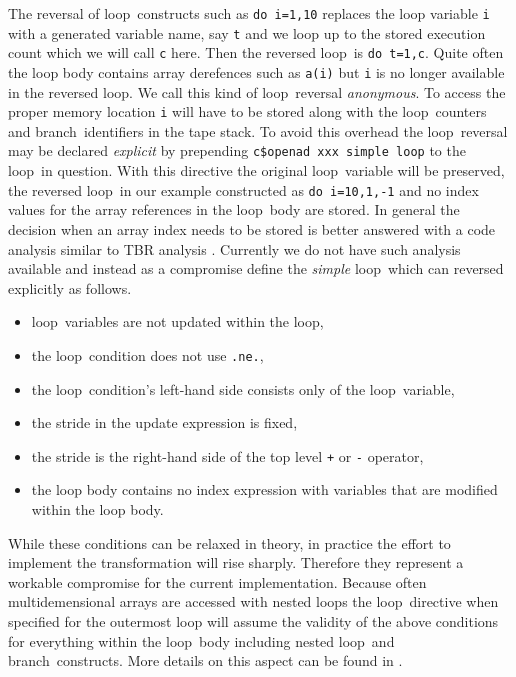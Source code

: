 \documentclass[11pt]{article}
\newcommand{\Loop}{loop}
\newcommand{\branch}{branch}
\newcommand{\code}[1]{{\small\tt{#1}}}
\begin{document}
The reversal of  \Loop\ constructs such as \code{do i=1,10} replaces 
the loop variable \code{i} with a generated variable name, say \code{t} and we 
loop up to  the stored execution count which we will call  \code{c} here. 
Then the reversed \Loop\ is \code{do t=1,c}. Quite often the loop body contains 
array derefences such as \code{a(i)} but \code{i} is no longer available in the 
reversed \Loop. We call this kind of \Loop\ reversal {\em anonymous}. 
To access the proper memory location \code{i} will have to be stored along with the 
\Loop\ counters and \branch\ identifiers in the tape stack.
To avoid this overhead the \Loop\ reversal may be declared {\em explicit}
by prepending \code{c\$openad xxx simple loop} to the \Loop\ in question. 
With this directive the original \Loop\ variable will be preserved,  
the reversed \Loop\ in our example constructed as \code{do i=10,1,-1} and 
no index values for the array references in the \Loop\ body are stored. 
In general the decision when an array index needs to be stored is better answered 
with a code analysis similar to TBR analysis \cite{HNP02}. 
Currently we do not have such  analysis available and instead 
as a compromise define the {\em simple}
\Loop\ which can reversed explicitly as follows. 
\begin{itemize}
  \parskip = -2pt
\item \Loop\ variables are not updated within the loop,
\item the \Loop\ condition does not use \code{.ne.},
\item the \Loop\ condition's left-hand side consists only of the \Loop\ variable,
\item the stride in the update expression is fixed,
\item the stride is the right-hand side of the top level \code{+} or \code{-} operator,
\item the loop body contains no index expression with variables that are modified within the loop body.
\end{itemize}
While these conditions can be relaxed in theory, in practice the effort to implement 
the transformation will rise sharply. Therefore they represent a workable compromise 
for the current implementation. 
Because often multidemensional arrays  are accessed with nested loops the 
\Loop\ directive when specified for the outermost loop will assume the validity 
of the above conditions for everything within the \Loop\ body including nested 
\Loop\ and \branch\ constructs. More details on this aspect can be found in 
\cite{scam_jss_se}. 
\end{document}
